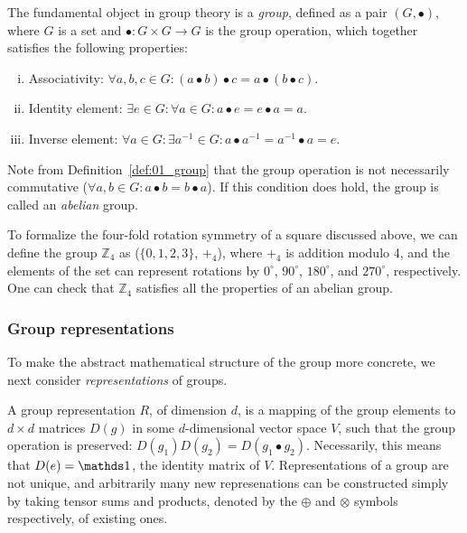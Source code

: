 \begin{definition}
\label{def:01_group}
The fundamental object in group theory is a \textit{group}, defined as a pair $(G, \bullet)$, where $G$ is a set and $\bullet: G \times G \rightarrow G$ is the group operation, which together satisfies the following properties:
\begin{enumerate}[i)]
	\item Associativity: $\forall a, b, c \in G: (a \bullet b) \bullet c = a \bullet (b \bullet c)$.
	\item Identity element: $\exists e \in G: \forall a \in G: a \bullet e = e \bullet a = a$.
	\item Inverse element: $\forall a \in G: \exists a^{-1} \in G: a \bullet a^{-1} = a^{-1} \bullet a = e$.
\end{enumerate}
\end{definition}

\begin{definition}
\label{def:01_abelian}
Note from Definition~\ref{def:01_group} that the group operation is not necessarily commutative ($\forall a, b \in G: a \bullet b = b \bullet a$).
If this condition does hold, the group is called an \textit{abelian} group.
\end{definition}

\begin{example}
\label{example:01_square}
To formalize the four-fold rotation symmetry of a square discussed above, we can define the group $\mathbb Z_4$  as ($\{0, 1, 2, 3\}$, $+_4$), where $+_4$ is addition modulo 4, and the elements of the set can represent rotations by $0^{\circ}$, $90^{\circ}$, $180^{\circ}$, and $270^{\circ}$, respectively.
One can check that $\mathbb Z_4$ satisfies all the properties of an abelian group.
\end{example}

\subsubsection{Group representations}

To make the abstract mathematical structure of the group more concrete, we next consider \textit{representations} of groups.

\begin{definition}
\label{def:01_representation}
A group representation $R$, of dimension $d$, is a mapping of the group elements to $d\times d$ matrices $D(g)$ in some $d$-dimensional vector space $V$, such that the group operation is preserved: $D(g_1)D(g_2) = D(g_1 \bullet g_2)$.
Necessarily, this means that $D(e) = \identity$, the identity matrix of $V$.
Representations of a group are not unique, and arbitrarily many new represenations can be constructed simply by taking tensor sums and products, denoted by the $\oplus$ and $\otimes$ symbols respectively, of existing ones.
\end{definition}

